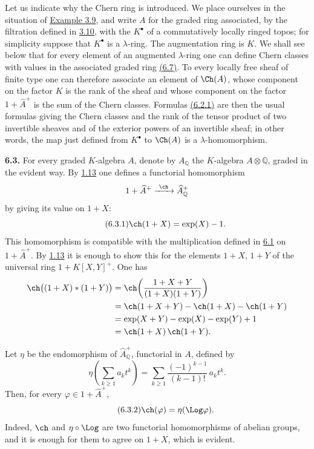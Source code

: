 Let us indicate why the Chern ring is introduced. We place ourselves in the situation of \hyperlink{sga6.e05.ex.3-9-1}{Example 3.9}, and write \(A\) for the graded ring associated, by the filtration defined in \hyperlink{sga6.e05.para.3-10}{3.10}, with the \(K^\bullet\) of a commutatively locally ringed topos; for simplicity suppose that \(K^\bullet\) is a \(\lambda\)-ring. The augmentation ring is \(K\). We shall see below that for every element of an augmented \(\lambda\)-ring one can define Chern classes with values in the associated graded ring \hyperlink{sga6.e05.para.6-7}{(6.7)}. To every locally free sheaf of finite type one can therefore associate an element of \(\Ch(A)\), whose component on the factor \(K\) is the rank of the sheaf and whose component on the factor \(1+\widehat A^+\) is the sum of the Chern classes. Formulas \hyperlink{sga6.e05.eq.6-2-1}{(6.2.1)} are then the usual formulas giving the Chern classes and the rank of the tensor product of two invertible sheaves and of the exterior powers of an invertible sheaf; in other words, the map just defined from \(K^\bullet\) to \(\Ch(A)\) is a \(\lambda\)-homomorphism.

\textbf{6.3.} For every graded \(K\)-algebra \(A\), denote by \(A_{\mathbb Q}\) the \(K\)-algebra \(A\otimes\mathbb Q\), graded in the evident way. By \hyperlink{sga6.e05.thm.1-13}{1.13} one defines a functorial homomorphism
\[
  1+\widehat A^+\xrightarrow{\ \ch\ }\widehat A_{\mathbb Q}^{+}
\]
by giving its value on \(1+X\):
\begin{equation}\tag{6.3.1}
  \ch(1+X)=\exp(X)-1.
\end{equation}
This homomorphism is compatible with the multiplication defined in \hyperlink{sga6.e05.para.6-1}{6.1} on \(1+\widehat A^+\). By \hyperlink{sga6.e05.thm.1-13}{1.13} it is enough to show this for the elements \(1+X\), \(1+Y\) of the universal ring \(1+K[X,Y]^+\). One has
\[
\begin{aligned}
 \ch\bigl((1+X)*(1+Y)\bigr)
 &= \ch\!\left(\frac{1+X+Y}{(1+X)(1+Y)}\right)\\
 &= \ch(1+X+Y)-\ch(1+X)-\ch(1+Y)\\
 &= \exp(X+Y)-\exp(X)-\exp(Y)+1\\
 &= \ch(1+X)\,\ch(1+Y).
\end{aligned}
\]

Let \(\eta\) be the endomorphism of \(\widehat A_{\mathbb Q}^{+}\), functorial in \(A\), defined by
\[
 \eta\!\left(\sum_{k\ge1} a_k t^k\right)
 =
 \sum_{k\ge1}\frac{(-1)^{k-1}}{(k-1)!}\,a_k t^k.
\]
Then, for every \(\varphi\in1+\widehat A^+\),
\begin{equation}\tag{6.3.2}
  \ch(\varphi)=\eta(\Log\varphi).
\end{equation}
Indeed, \(\ch\) and \(\eta\circ\Log\) are two functorial homomorphisms of abelian groups, and it is enough for them to agree on \(1+X\), which is evident.

